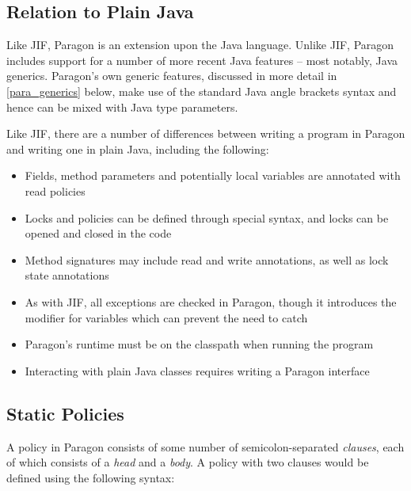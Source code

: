 \subsection{Relation to Plain Java}

Like JIF, Paragon is an extension upon the Java language. Unlike JIF, Paragon includes support for a number of more recent Java features -- most notably, Java generics. Paragon's own generic features, discussed in more detail in \ref{para_generics} below, make use of the standard Java angle brackets syntax and hence can be mixed with Java type parameters.

Like JIF, there are a number of differences between writing a program in Paragon and writing one in plain Java, including the following:

\begin{itemize}
	
	\item Fields, method parameters and potentially local variables are annotated with read policies
	
	\item Locks and policies can be defined through special syntax, and locks can be opened and closed in the code
	
	\item Method signatures may include read and write annotations, as well as lock state annotations
	
	\item As with JIF, all exceptions are checked in Paragon, though it introduces the  modifier for variables which can prevent the need to catch 
	
	\item Paragon's runtime must be on the classpath when running the program
	
	\item Interacting with plain Java classes requires writing a Paragon interface
	
\end{itemize}

\subsection{Static Policies}

A policy in Paragon consists of some number of semicolon-separated \textit{clauses}, each of which consists of a \textit{head} and a \textit{body}. A policy  with two clauses would be defined using the following syntax:

